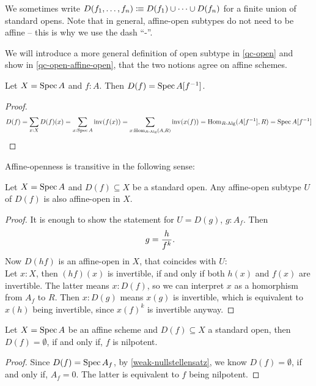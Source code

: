 We sometimes write $D(f_1, \dots, f_n) \vcentcolon\mspace{-1.2mu}\equiv D(f_1) \cup \dots \cup D(f_n)$
for a finite union of standard opens.
Note that in general, affine-open subtypes do not need to be affine
-- this is why we use the dash ``-''.

We will introduce a more general definition of open subtype in \cref{qc-open}
and show in \cref{qc-open-affine-open}, that the two notions agree on affine schemes.

\begin{proposition}
  Let $X = \operatorname{Spec} A$ and $f : A$.
  Then $D(f) = \operatorname{Spec} A[f^{-1}]$.
\end{proposition}

\begin{proof}
  \[ D(f) =
     \sum_{x : X} D(f)(x) =
     \sum_{x : \operatorname{Spec} A} \mathrm{inv}(f(x)) =
     \sum_{x : \mathrm{Hom}_{R\text{-}\mathrm{Alg}}(A, R)} \mathrm{inv}(x(f)) =
     \mathrm{Hom}_{R\text{-}\mathrm{Alg}}(A[f^{-1}], R) =
     \operatorname{Spec} A[f^{-1}]
     \]
\end{proof}

Affine-openness is transitive in the following sense:

\begin{lemma}%
  \label{affine-open-trans}
  Let $X=\operatorname{Spec} A$ and $D(f)\subseteq X$ be a standard open.
  Any affine-open subtype $U$ of $D(f)$ is also affine-open in $X$.
\end{lemma}

\begin{proof}
  It is enough to show the statement for $U=D(g)$, $g:A_f$.
  Then
  \[ g=\frac{h}{f^k}\rlap{.}\]
  Now $D(hf)$ is an affine-open in $X$,
  that coincides with $U$: \\
  Let $x:X$, then $(hf)(x)$ is invertible, if and only if both $h(x)$ and $f(x)$ are invertible.
  The latter means $x:D(f)$, so we can interpret $x$ as a homorphism from $A_f$ to $R$.
  Then $x:D(g)$ means $x(g)$ is invertible, which is equivalent to $x(h)$ being invertible,
  since $x(f)^k$ is invertible anyway.
\end{proof}

\begin{lemma}%
  \label{standard-open-empty}
  Let $X=\operatorname{Spec} A$ be an affine scheme and $D(f)\subseteq X$ a standard open,
  then $D(f)=\emptyset$, if and only if, $f$ is nilpotent.
\end{lemma}

\begin{proof}
  Since $D(f)=\operatorname{Spec} A_f$, by \cref{weak-nullstellensatz}, we know $D(f)=\emptyset$,
  if and only if, $A_f=0$.
  The latter is equivalent to $f$ being nilpotent.
\end{proof}


